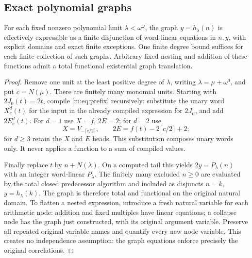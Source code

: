 \subsection{Exact polynomial graphs}
\begin{theorem}\label{m:thm:graphs}
For each fixed nonzero polynomial limit $\lambda<\omega^\omega$, the graph
$y=h_\lambda(n)$ is effectively expressible as a finite disjunction of
word-linear equations in $n,y$, with explicit domains and exact finite
exceptions. One finite degree bound suffices for each finite collection of
such graphs. Arbitrary fixed nesting and addition of these functions admit
a total functional existential graph translation.
\end{theorem}
\begin{proof}
Remove one unit at the least positive degree of $\lambda$, writing
$\lambda=\mu+\omega^d$, and put $c=N(\mu)$. There are finitely many
monomial units. Starting with $2J_0(t)=2t$, compile \eqref{m:eq:prefix}
recursively: substitute the unary word $X^d_c(t)$ for the input in the
already compiled expression for $2J_\mu$, and add $2E^d_c(t)$. For $d=1$
use $X=f$, $2E=2$; for $d=2$ use
\[
 X=V_{-\lceil c/2\rceil},\qquad
 2E=f(t)-2\lceil c/2\rceil+2;
\]
for $d\ge3$ retain the $X$ and $E$ heads. This substitution composes unary
words only. It never applies a function to a sum of compiled values.

Finally replace $t$ by $n+N(\lambda)$. On a computed tail this yields
$2y=P_\lambda(n)$ with an integer word-linear $P_\lambda$. The finitely
many excluded $n\ge0$ are evaluated by the total closed predecessor
algorithm and included as disjuncts $n=k$, $y=h_\lambda(k)$. The graph is
therefore total and functional on the original natural domain.
To flatten a nested expression, introduce a fresh natural variable for
each arithmetic node: addition and fixed multiples have linear equations;
a collapse node has the graph just constructed, with its original argument
variable. Preserve all repeated original variable names and quantify every
new node variable. This creates no independence assumption: the graph
equations enforce precisely the original correlations.
\end{proof}

